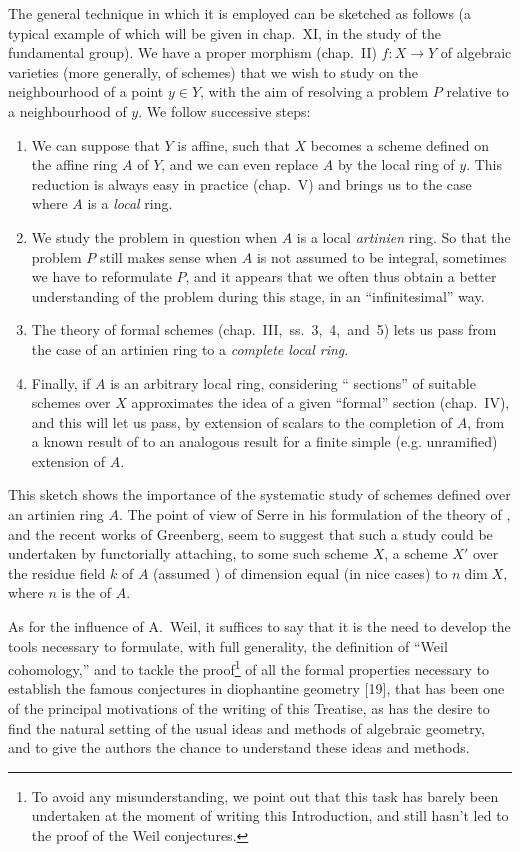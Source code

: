 \documentclass[../main.tex]{subfiles}
\begin{document}
The general technique in which it is employed can be sketched as follows (a typical example of which will be given in chap.~XI, in the study of the fundamental group).
We have a proper morphism (chap.~II) $f\colon X\to Y$ of algebraic varieties (more generally, of schemes) that we wish to study on the neighbourhood of a point $y\in Y$, with the aim of resolving a problem $P$ relative to a neighbourhood of $y$.
We follow successive steps:
\begin{enumerate}
    \item We can suppose that $Y$ is affine, such that $X$ becomes a scheme defined on the affine ring $A$ of $Y$, and we can even replace $A$ by the local ring of $y$.
    This reduction is always easy in practice (chap.~V) and brings us to the case where $A$ is a \emph{local} ring.
    \item We study the problem in question when $A$ is a local \emph{artinien} ring.
    So that the problem $P$ still makes sense when $A$ is not assumed to be integral, sometimes we have to reformulate $P$, and it appears that we often thus obtain a better understanding of the problem during this stage, in an ``infinitesimal'' way.
    \item The theory of formal schemes (chap.~III,~ss.~3,~4,~and~5) lets us pass from the case of an artinien ring to a \emph{complete local ring}.
    \item Finally, if $A$ is an arbitrary local ring, considering `` sections'' of suitable schemes over $X$ approximates the idea of a given ``formal'' section (chap.~IV), and this will let us pass, by extension of scalars to the completion of $A$, from a known result of \completelyunsure to an analogous result for a finite simple (e.g. unramified) extension of $A$.
\end{enumerate}

This sketch shows the importance of the systematic study of schemes defined over an artinien ring $A$.
The point of view of Serre in his formulation of the theory of , and the recent works of Greenberg, seem to suggest that such a study could be undertaken by functorially attaching, to some such scheme $X$, a scheme $X'$ over the residue field $k$ of $A$ (assumed ) of dimension equal (in nice cases) to $n\dim X$, where $n$ is the  of $A$.

As for the influence of A.~Weil, it suffices to say that it is the need to develop the tools necessary to formulate, with full generality, the definition of ``Weil cohomology,'' and to tackle the proof\footnote[1]{To avoid any misunderstanding, we point out that this task has barely been undertaken at the moment of writing this Introduction, and still hasn't led to the proof of the Weil conjectures.} of all the formal properties necessary to establish the famous conjectures in diophantine geometry [19], that has been one of the principal motivations of the writing of this Treatise, as has the desire to find the natural setting of the usual ideas and methods of algebraic geometry, and to give the authors the chance to understand these ideas and methods.
\end{document}
